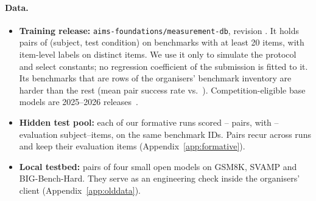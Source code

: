 \documentclass{article}
\begin{document}
\paragraph{Data.}
\begin{itemize}
\item \textbf{Training release:} \texttt{aims-foundations/measurement-db}, revision \texttt{\FitRevisionShort}. It holds \XpFrNPairs{} pairs of (subject, test condition) on \XpFrNBench{} benchmarks with at least 20 items, with \XpFrNRows{} item-level labels on \XpFrNItems{} distinct items. We use it only to simulate the protocol and select constants; no regression coefficient of the submission is fitted to it. Its \DdPopNInvBench{} benchmarks that are rows of the organisers' benchmark inventory are harder than the rest (mean pair success rate \DdPopInvRate{} vs.\ \DdPopNonInvRate). Competition-eligible base models are 2025--2026 releases~\citep{paiec2026}.
\item \textbf{Hidden test pool:} each of our formative runs scored \ArPairsMin--\ArPairsMax{} pairs, with \ArItemsMin--\ArItemsMax{} evaluation subject--items, on the same \ArBenchAll{} benchmark IDs. Pairs recur across runs and keep their evaluation items (Appendix~\ref{app:formative}).
\item \textbf{Local testbed:} \XpRealNPairs{} pairs of four small open models on GSM8K, SVAMP and BIG-Bench-Hard. They serve as an engineering check inside the organisers' client (Appendix~\ref{app:olddata}).
\end{itemize}
\end{document}
